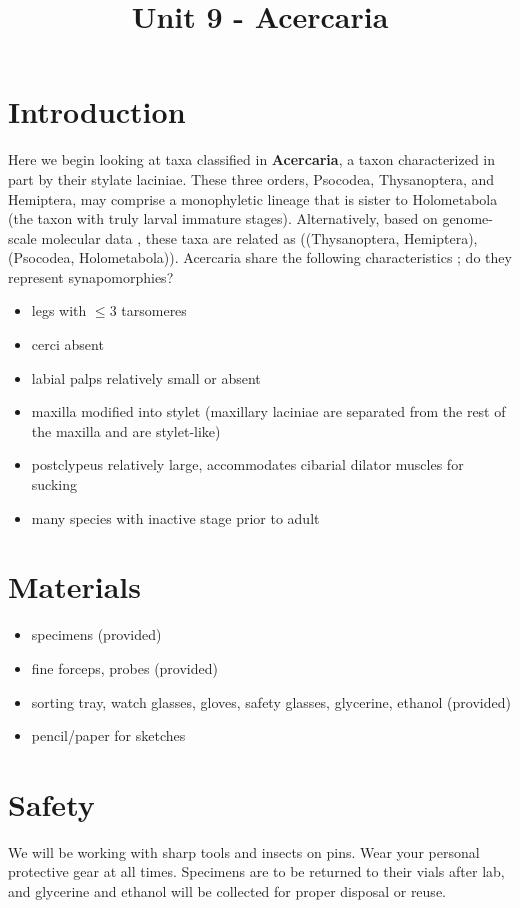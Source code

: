 \documentclass[letterpaper, 11pt]{article}
\title{Unit 9 - Acercaria}
\author{}
\begin{document}
\cleanlookdateon %
\maketitle
\thispagestyle{fancy}
\section*{Introduction}
Here we begin looking at taxa classified in \textbf{Acercaria}, a taxon characterized in part by their stylate laciniae. These three orders, Psocodea, Thysanoptera, and Hemiptera, may comprise a monophyletic lineage that is sister to Holometabola (the taxon with truly larval immature stages). Alternatively, based on genome-scale molecular data \citep{Misof763}, these taxa are related as ((Thysanoptera, Hemiptera),(Psocodea, Holometabola)). Acercaria share the following characteristics \citep{beutel2013insect}; do they represent synapomorphies?

\begin{itemize}
\item legs with $\le$3 tarsomeres
\item cerci absent 
\item labial palps relatively small or absent 
\item maxilla modified into stylet (maxillary laciniae are separated from the rest of the maxilla and are stylet-like)
\item postclypeus relatively large, accommodates cibarial dilator muscles for sucking
\item many species with inactive stage prior to adult
\end{itemize}

\section*{Materials}

\begin{itemize}
\item specimens (provided)
\item fine forceps, probes (provided)
\item sorting tray, watch glasses, gloves, safety glasses, glycerine, ethanol (provided)
\item pencil/paper for sketches
\end{itemize}

\section*{Safety}
We will be working with sharp tools and insects on pins. Wear your personal protective gear at all times. Specimens are to be returned to their vials after lab, and glycerine and ethanol will be collected for proper disposal or reuse.
\end{document}
